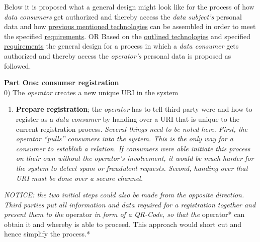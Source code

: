 \documentclass[12pt,english,a4paper,titlepage,cleardoublepage=empty,dottedtoc]{report}
\providecommand{\tightlist}{%
  \setlength{\itemsep}{0pt}\setlength{\parskip}{0pt}}
\begin{document}
Below it is proposed what a general design might look like for the
process of how \emph{data consumers} get authorized and thereby access
the \emph{data subject's} personal data and how
\protect\hyperlink{standards-specifications-and-related-technologies}{previous
mentioned technologies} can be assembled in order to meet the specified
\protect\hyperlink{requirements}{requirements}. OR Based on the
\protect\hyperlink{standards-specifications-and-related-technologies}{outlined
technologies} and specified
\protect\hyperlink{requirements}{requirements} the general design for a
process in which a \emph{data consumer} gets authorized and thereby
access the \emph{operator's} personal data is proposed as followed.

\textbf{Part One: consumer registration}\\
0) The \emph{operator} creates a new unique URI in the system

\begin{enumerate}
\def\labelenumi{\arabic{enumi})}
\tightlist
\item
  \textbf{Prepare registration}; the \emph{operator} has to tell third
  party were and how to register as a \emph{data consumer} by handing
  over a URI that is unique to the current registration process.
  \emph{Several things need to be noted here. First, the operator
  ``pulls'' consumers into the system. This is the only way for a
  consumer to establish a relation. If consumers were able initiate this
  process on their own without the operator's involvement, it would be
  much harder for the system to detect spam or fraudulent requests.
  Second, handing over that URI must be done over a secure channel.}
\end{enumerate}

\emph{NOTICE: the two initial steps could also be made from the opposite
direction. Third parties put all information and data required for a
registration together and present them to the }operator\emph{ in form of
a QR-Code, so that the }operator* can obtain it and whereby is able to
proceed. This approach would short cut and hence simplify the process.*
\end{document}
